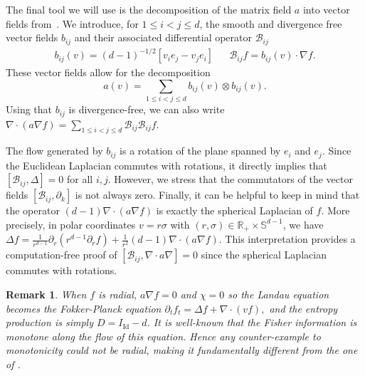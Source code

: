 \documentclass[11pt,a4paper]{article}
\theoremstyle{definition}
\theoremstyle{plain}
\newtheorem{remark}[defi]{Remark}
\DeclareMathOperator*{\Id}{Id}
\begin{document}
The final tool we will use is the decomposition of the matrix field $a$ into vector fields from~\cite{GuillenSilvestre2023}. We introduce, for $1\leq i<j\leq d$, the smooth and divergence free vector fields $b_{ij}$ and their associated differential operator $\mathcal{B}_{ij}$
\begin{align*}
    b_{ij}(v)=(d-1)^{-1/2}\left[v_i e_j - v_j e_i\right] && \mathcal{B}_{ij}f = b_{ij}(v)\cdot \nabla f.
\end{align*}
These vector fields allow for the decomposition
\begin{equation}
    \label{eq:decomp_a}
    a(v)=\sum_{1\leq i<j \leq d}b_{ij}(v)\otimes b_{ij}(v).
\end{equation}
Using that $b_{ij}$ is divergence-free, we can also write $\nabla \cdot(a\nabla f)=\sum_{1\leq i<j \leq d}\mathcal{B}_{ij} \mathcal{B}_{ij}f $.

The flow generated by $b_{ij}$ is a rotation of the plane spanned by $e_i$ and $e_j$. Since the Euclidean Laplacian commutes with rotations, it directly implies that $[\mathcal{B}_{ij},\Delta]=0$ for all $i,j$. However, we stress that the commutators of the vector fields $[\mathcal{B}_{ij},\partial_k]$ is not always zero. Finally, it can be helpful to keep in mind that the operator $(d-1)\nabla \cdot (a\nabla f)$ is exactly the spherical Laplacian of $f$. More precisely, in polar coordinates $v=r\sigma$ with $(r,\sigma)\in \mathbb{R}_+\times \mathbb{S}^{d-1}$, we have $\Delta  f=\frac{1}{r^{d-1}}\partial_r (r^{d-1} \partial_r f) +\frac{1}{r^2}(d-1)\nabla \cdot (a\nabla f)$. This interpretation provides a computation-free proof of $[\mathcal{B}_{ij},\nabla  \cdot a \nabla ]=0$ since the spherical Laplacian commutes with rotations.

\begin{remark}
\label{rem:radialcase}
When $f$ is radial, $a\nabla f=0$ and $\chi=0$ so the Landau equation becomes the Fokker-Planck equation $\partial_t f_t =\Delta f + \nabla\cdot(vf),$ and the entropy production is simply $D=I_{\Id}-d$. It is well-known that the Fisher information is monotone along the flow of this equation. Hence any counter-example to monotonicity could not be radial, making it fundamentally different from the one of \cite{Silvestre2026}.
\end{remark}
\end{document}
